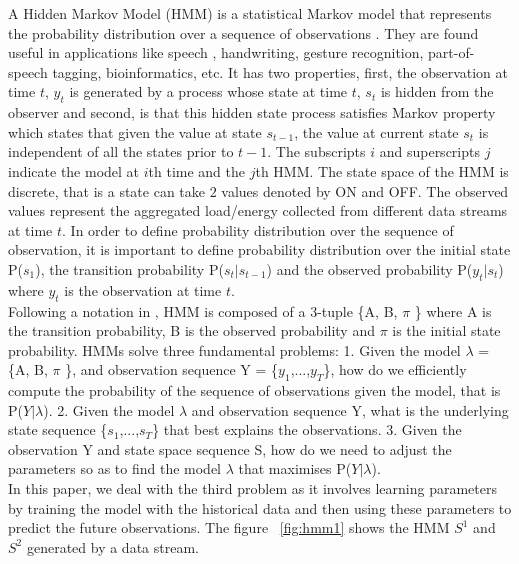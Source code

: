 \documentclass[runningheads,a4paper]{llncs}
\begin{document}
A Hidden Markov Model (HMM) is a statistical Markov model that represents the probability distribution over a sequence of observations \cite{Ghahramani}. They are found useful in applications like speech \cite{Rabiner}, handwriting, gesture recognition, part-of-speech tagging, bioinformatics, etc. It has two properties, first, the observation at time $t$, $y_{t}$ is generated by a process whose state at time $t$, $s_{t}$ is hidden from the observer and second, is that this hidden state process satisfies Markov property which states that given the value at state $s_{t-1}$, the value at current state $s_{t}$ is independent of all the states prior to $t-1$. The subscripts $i$ and superscripts $j$ indicate the model at $i$th time and the $j$th HMM. The state space of the HMM is discrete, that is a state can take $2$ values denoted by ON and OFF. The observed values represent the aggregated load/energy collected from different data streams at time $t$. In order to define probability distribution over the sequence of observation, it is important to define probability distribution over the initial state P($s_{1}$), the transition probability P($s_{t}|s_{t-1}$) and the observed probability P($y_{t}|s_{t}$) where $y_{t}$ is the observation at time $t$. \\
Following a notation in \cite{Rabiner}, HMM is composed of a 3-tuple \{A, B, $\pi$ \} where A is the transition probability, B is the observed probability and $\pi$ is the initial state probability.
HMMs solve three fundamental problems:
1. Given the model $\lambda$ = \{A, B, $\pi$ \}, and observation sequence Y = \{$y_{1}$,...,$y_{T}$\}, how do we efficiently compute the probability of the sequence of observations given the model, that is P($Y|\lambda$).
2. Given the model $\lambda$ and observation sequence Y, what is the underlying state sequence \{$s_{1}$,...,$s_{T}$\} that best explains the observations.
3. Given the observation Y and state space sequence S, how do we need to adjust the parameters so as to find the model $\lambda$ that maximises P($Y|\lambda$).\\
In this paper, we deal with the third problem as it involves learning parameters by training the model with the historical data and then using these parameters to predict the future observations.
The figure ~\ref{fig:hmm1} shows the HMM $S^1$ and $S^2$ generated by a data stream.
\end{document}
